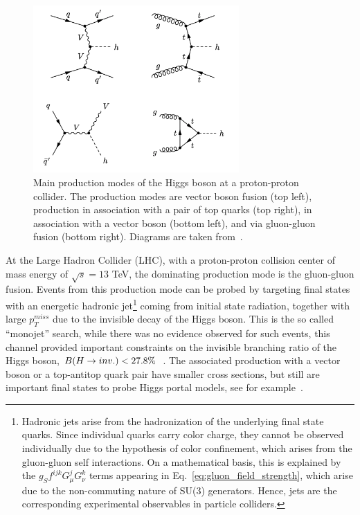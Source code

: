 \begin{figure}
    \centering
    \includegraphics[width=0.7\textwidth]{all_higgs_prod.png}    
    \caption{Main production modes of the Higgs boson at a proton-proton collider. The production modes are vector boson fusion (top left), production in association with
    a pair of top quarks (top right), in association with a vector boson (bottom left), and via gluon-gluon fusion (bottom right). Diagrams are taken from~\cite{Argyropoulos:2021sav}.}
    \label{fig:all_higgs_prod}
\end{figure}

At the Large Hadron Collider (LHC), with a proton-proton collision center of mass energy of $\sqrt{s} = 13$ TeV, the dominating production mode is the gluon-gluon fusion. Events from 
this production mode can be probed by targeting final states with an energetic hadronic jet\footnote{Hadronic jets arise from the hadronization of the
underlying final state quarks. Since individual quarks carry color charge, they cannot be observed individually due to the hypothesis of color confinement,
which arises from the gluon-gluon self interactions. On a mathematical basis, this is explained by the $g_{S} f^{ijk} G_{\mu}^{j} G_{\nu}^{k}$ terms appearing in 
Eq.~\ref{eq:gluon_field_strength}, which arise due to the non-commuting nature of SU(3) generators. Hence, jets are the corresponding 
experimental observables in particle colliders.} 
coming from initial state radiation, together with large $p_T^{miss}$ due to the invisible decay
of the Higgs boson. This is the so called ``monojet'' search, while there was no evidence observed for such events, this channel provided important constraints on the invisible
branching ratio of the Higgs boson, $B(H \rightarrow inv.) < 27.8\%$~\cite{CMS:2021far}. The associated production with a vector boson or a top-antitop quark pair have smaller cross sections,
but still are important final states to probe Higgs portal models, see for example~\cite{CMS:2023sdw}.

